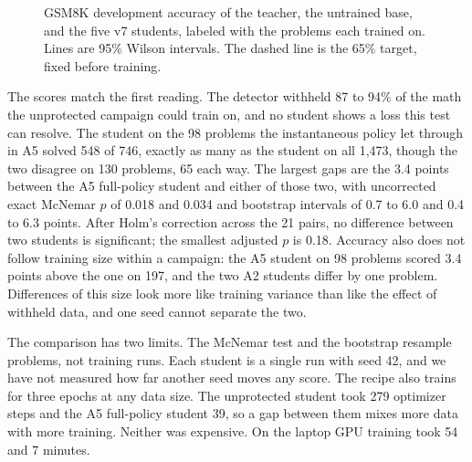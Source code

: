 \documentclass[journal]{IEEEtran}
\begin{document}
\begin{figure}[!t]
\centering
{}
\caption{GSM8K development accuracy of the teacher, the untrained base, and the five v7 students, labeled with the problems each trained on. Lines are 95\% Wilson intervals. The dashed line is the 65\% target, fixed before training.}
\label{fig:students}
\end{figure}

The scores match the first reading. The detector withheld 87 to 94\% of the math the unprotected campaign could train on, and no student shows a loss this test can resolve. The student on the 98 problems the instantaneous policy let through in A5 solved 548 of 746, exactly as many as the student on all 1,473, though the two disagree on 130 problems, 65 each way. The largest gaps are the 3.4 points between the A5 full-policy student and either of those two, with uncorrected exact McNemar $p$ of 0.018 and 0.034 and bootstrap intervals of 0.7 to 6.0 and 0.4 to 6.3 points. After Holm's correction across the 21 pairs, no difference between two students is significant; the smallest adjusted $p$ is 0.18. Accuracy also does not follow training size within a campaign: the A5 student on 98 problems scored 3.4 points above the one on 197, and the two A2 students differ by one problem. Differences of this size look more like training variance than like the effect of withheld data, and one seed cannot separate the two.

The comparison has two limits. The McNemar test and the bootstrap resample problems, not training runs. Each student is a single run with seed 42, and we have not measured how far another seed moves any score. The recipe also trains for three epochs at any data size. The unprotected student took 279 optimizer steps and the A5 full-policy student 39, so a gap between them mixes more data with more training. Neither was expensive. On the laptop GPU training took 54 and 7 minutes.
\end{document}
